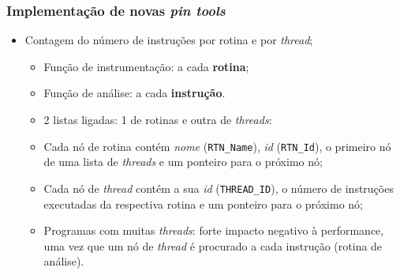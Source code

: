 \documentclass[10pt]{beamer}
\begin{document}
\begin{frame}
\frametitle{Implementação de novas \textit{pin tools}}

\begin{itemize}
  \item Contagem do número de instruções por rotina e por \textit{thread};
  \begin{itemize}
    \item Função de instrumentação: a cada \textbf{rotina};
    \item Função de análise: a cada \textbf{instrução}.
    \item 2 listas ligadas: 1 de rotinas e outra de \textit{threads}:
    \item Cada nó de rotina contém \textit{nome} (\texttt{RTN\_Name}),
    \textit{id} (\texttt{RTN\_Id}), o primeiro nó de uma lista de
    \textit{threads} e um ponteiro para o próximo nó;
    \item Cada nó de \textit{thread} contém a sua \textit{id}
    (\texttt{THREAD\_ID}), o número de instruções executadas da respectiva
    rotina e um ponteiro para o próximo nó;
    \item Programas com muitas \textit{threads}: forte impacto negativo à
    performance, uma vez que um nó de \textit{thread} é procurado a cada
    instrução (rotina de análise).
  \end{itemize}
  
\end{itemize}

\end{frame}
\end{document}
